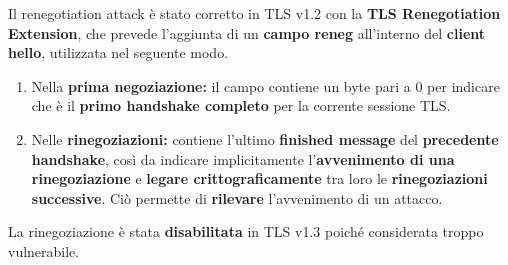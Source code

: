 Il renegotiation attack è stato corretto in TLS v1.2 con la \textbf{TLS Renegotiation Extension}, che prevede l'aggiunta di un \textbf{campo reneg} all'interno del \textbf{client hello}, utilizzata nel seguente modo.
\begin{enumerate}
    \item Nella \textbf{prima negoziazione:} il campo contiene un byte pari a 0 per indicare che è il \textbf{primo handshake completo} per la corrente sessione TLS.
    \item Nelle \textbf{rinegoziazioni:} contiene l'ultimo \textbf{finished message} del \textbf{precedente handshake}, così da indicare implicitamente l'\textbf{avvenimento di una rinegoziazione} e \textbf{legare crittograficamente} tra loro le \textbf{rinegoziazioni successive}. Ciò permette di \textbf{rilevare} l'avvenimento di un attacco.
\end{enumerate}
\begin{note}
La rinegoziazione è stata \textbf{disabilitata} in TLS v1.3 poiché considerata troppo vulnerabile.
\end{note}
